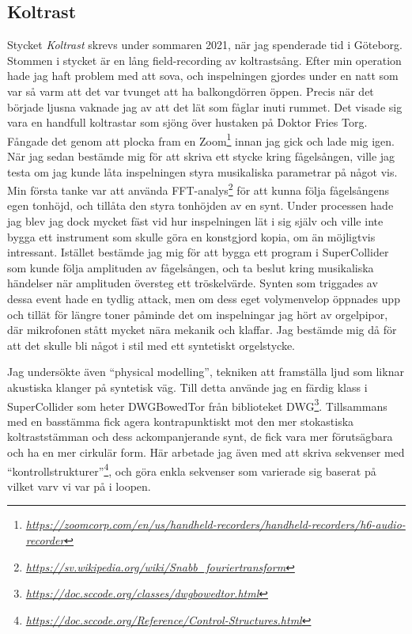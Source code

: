 \documentclass{article}
\begin{document}
\subsection{Koltrast}
Stycket \emph{Koltrast} skrevs under sommaren 2021, när jag spenderade tid i Göteborg. Stommen i stycket
är en lång field-recording av koltrastsång. Efter min operation hade jag haft problem med att sova, och
inspelningen gjordes under en natt som var så varm att det var tvunget att ha balkongdörren öppen. Precis
när det började ljusna vaknade jag av att det lät som fåglar inuti rummet. Det visade sig vara en handfull
koltrastar som sjöng över hustaken på Doktor Fries Torg. Fångade det genom att plocka fram en
Zoom\footnote{\emph{\url{https://zoomcorp.com/en/us/handheld-recorders/handheld-recorders/h6-audio-recorder}}} innan
jag gick och lade mig igen. När jag sedan bestämde mig för att skriva ett stycke kring fågelsången, ville
jag testa om jag kunde låta inspelningen styra musikaliska parametrar på något vis. Min första tanke var
att använda FFT-analys\footnote{\emph{\url{https://sv.wikipedia.org/wiki/Snabb\_fouriertransform}}} för att kunna följa
fågelsångens egen tonhöjd, och tillåta den styra
tonhöjden av en synt. Under processen hade jag blev jag dock mycket fäst vid hur inspelningen lät i sig
själv och ville inte bygga ett instrument som skulle göra en konstgjord kopia, om än möjligtvis
intressant. Istället bestämde jag mig för att bygga ett program i SuperCollider som kunde följa amplituden
av fågelsången, och ta beslut kring musikaliska händelser när amplituden översteg ett tröskelvärde. Synten
som triggades av dessa event hade en tydlig attack, men om dess eget volymenvelop öppnades upp och tillät
för längre toner påminde det om inspelningar jag hört av orgelpipor, där mikrofonen stått mycket nära
mekanik och klaffar. Jag bestämde mig då för att det skulle bli något i stil med ett syntetiskt
orgelstycke.


Jag undersökte även ``physical modelling'', tekniken att framställa ljud som liknar akustiska klanger på
syntetisk väg. Till detta använde jag en färdig klass i SuperCollider som heter DWGBowedTor från
biblioteket DWG\footnote{\emph{\url{https://doc.sccode.org/classes/dwgbowedtor.html}}}. Tillsammans med en basstämma fick agera kontrapunktiskt mot den mer
stokastiska koltraststämman och dess ackompanjerande synt, de fick vara mer förutsägbara och ha en mer
cirkulär form. Här arbetade jag även med att skriva sekvenser med ``kontrollstrukturer''\footnote{\emph{\url{https://doc.sccode.org/Reference/Control-Structures.html}}}, och göra enkla sekvenser som varierade sig baserat på vilket varv vi var på i
loopen. 
\pagebreak
\end{document}
